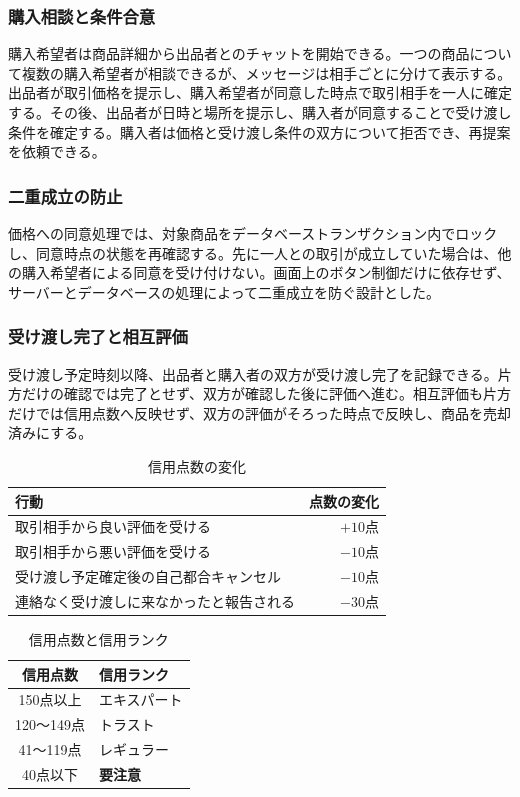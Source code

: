 \documentclass[11pt,a4paper]{article}
\begin{document}
\subsubsection{購入相談と条件合意}

購入希望者は商品詳細から出品者とのチャットを開始できる。一つの商品について複数の購入希望者が相談できるが、メッセージは相手ごとに分けて表示する。出品者が取引価格を提示し、購入希望者が同意した時点で取引相手を一人に確定する。その後、出品者が日時と場所を提示し、購入者が同意することで受け渡し条件を確定する。購入者は価格と受け渡し条件の双方について拒否でき、再提案を依頼できる。

\subsubsection{二重成立の防止}

価格への同意処理では、対象商品をデータベーストランザクション内でロックし、同意時点の状態を再確認する。先に一人との取引が成立していた場合は、他の購入希望者による同意を受け付けない。画面上のボタン制御だけに依存せず、サーバーとデータベースの処理によって二重成立を防ぐ設計とした。

\subsubsection{受け渡し完了と相互評価}

受け渡し予定時刻以降、出品者と購入者の双方が受け渡し完了を記録できる。片方だけの確認では完了とせず、双方が確認した後に評価へ進む。相互評価も片方だけでは信用点数へ反映せず、双方の評価がそろった時点で反映し、商品を売却済みにする。

\begin{table}[H]
  \centering
  \caption{信用点数の変化}
  \begin{tabularx}{0.86\textwidth}{Xr}
    \toprule
    行動 & 点数の変化\\
    \midrule
    取引相手から良い評価を受ける & $+10$点\\
    取引相手から悪い評価を受ける & $-10$点\\
    受け渡し予定確定後の自己都合キャンセル & $-10$点\\
    連絡なく受け渡しに来なかったと報告される & $-30$点\\
    \bottomrule
  \end{tabularx}
\end{table}

\begin{table}[H]
  \centering
  \caption{信用点数と信用ランク}
  \begin{tabular}{cl}
    \toprule
    信用点数 & 信用ランク\\
    \midrule
    150点以上 & エキスパート\\
    120〜149点 & トラスト\\
    41〜119点 & レギュラー\\
    40点以下 & \textcolor{warningred}{\textbf{要注意}}\\
    \bottomrule
  \end{tabular}
\end{table}
\end{document}
